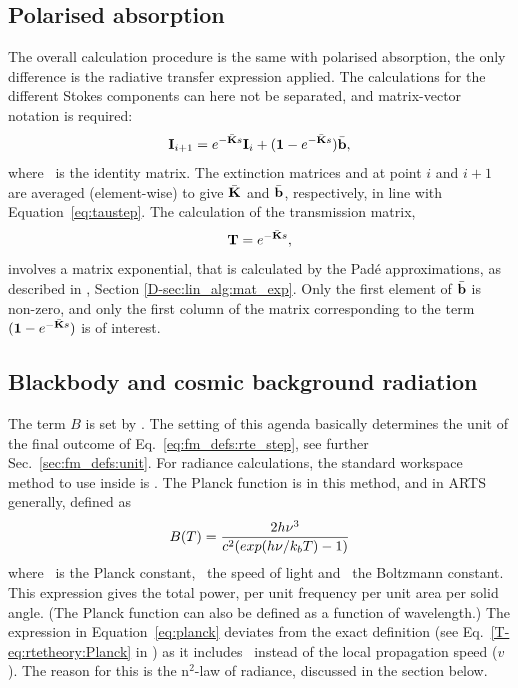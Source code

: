 \subsection{Polarised absorption}

The overall calculation procedure is the same with polarised absorption, the
only difference is the radiative transfer expression applied. The calculations
for the different Stokes components can here not be separated, and
matrix-vector notation is required: 
\begin{equation}
  \label{eq:fm_defs:vrte_step}
  {\bf I}_{i+1} = e^{-\bar{{\bf K}}s} {\bf I}_i + 
                  (\mathbf{1}-e^{-\bar{{\bf K}}s})\bar{\mathbf{b}},
\end{equation}
where \IdnMtr\ is the identity matrix. The extinction matrices and 
at point $i$ and $i+1$ are averaged (element-wise) to give $\bar{{\bf K}}$ and
$\bar{\mathbf{b}}$, respectively, in line with Equation~\ref{eq:taustep}. The
calculation of the transmission matrix,
\begin{equation}
  \mathbf{T} = e^{-\bar{{\bf K}}s},
  \label{eq:rte:transmat}
\end{equation}
involves a matrix exponential, that is calculated by the Pad\'e approximations,
as described in \developer, Section \ref{D-sec:lin_alg:mat_exp}. Only the first
element of $\bar{\mathbf{b}}$ is non-zero, and only the first column of the
matrix corresponding to the term $(\mathbf{1}-e^{-\bar{{\bf K}}s})$ is of interest.



\subsection{Blackbody and cosmic background radiation}

The term $B$ is set by . The setting of
this agenda basically determines the unit of the final outcome of
Eq.~\ref{eq:fm_defs:rte_step}, see further Sec.~\ref{sec:fm_defs:unit}. For
radiance calculations, the standard workspace method to use inside
 is
. The Planck function is in this method,
and in ARTS generally, defined as
\begin{equation}
  \label{eq:planck}
  B(T) = \frac{2h\nu^3}
                  {c^2(exp(h\nu/k_bT)-1)}
\end{equation}
where \planckCns\ is the Planck constant, \speedoflight\ the speed of light and
\boltzmannCns\ the Boltzmann constant. This expression gives the total power,
per unit frequency per unit area per solid angle. (The Planck function can also
be defined as a function of wavelength.) The expression in
Equation~\ref{eq:planck} deviates from the exact definition (see
Eq.~\ref{T-eq:rtetheory:Planck} in \theory) as it includes \speedoflight\
instead of the local propagation speed ($v$). The reason for this is the
n$^2$-law of radiance, discussed in the section below.

